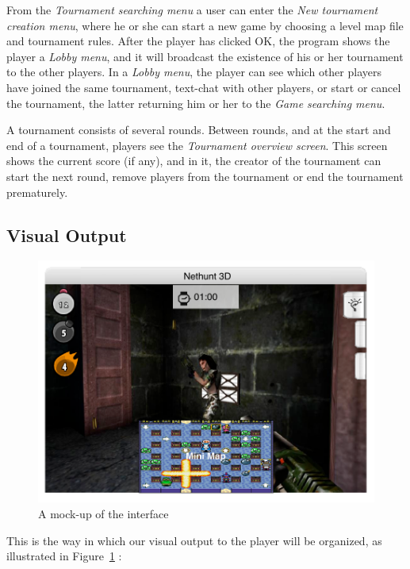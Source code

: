 \documentclass[a4paper,twoside,11pt]{article}
\begin{document}
From the \emph{Tournament searching menu} a user can enter the \emph{New tournament creation menu}, where he or she can start a new game by choosing a level map file and tournament rules. After the player has clicked OK, the program shows the player a \emph{Lobby menu}, and it will broadcast the existence of his or her tournament to the other players. In a \emph{Lobby menu}, the player can see which other players have joined the same tournament, text-chat with other players, or start or cancel the tournament, the latter returning him or her to the \emph{Game searching menu}.

A tournament consists of several rounds. Between rounds, and at the start and end of a tournament, players see the \emph{Tournament overview screen}. This screen shows the current score (if any), and in it, the creator of the tournament can start the next round, remove players from the tournament or end the tournament prematurely.

\subsection{Visual Output}

\begin{figure}[!ht]
  \centering
\includegraphics[width=\textwidth]{diagrams/interface}
  \caption{A mock-up of the interface} \label{fig:interface}
\end{figure}


\label{interface}

This is the way in which our visual output to the player will be organized, as illustrated in Figure~\ref{fig:interface} :
\end{document}
